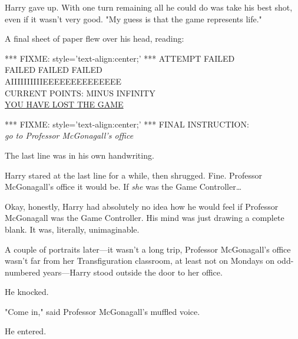 Harry gave up. With one turn remaining all he could do was take his best shot, 
even if it wasn't very good. "My guess is that the game represents life."

A final sheet of paper flew over his head, reading:

*** FIXME: style='text-align:center;' ***
ATTEMPT FAILED\\
FAILED FAILED FAILED\\
AIIIIIIIIIIEEEEEEEEEEEEEE\\
CURRENT POINTS: MINUS INFINITY\\
\underline{YOU HAVE LOST THE GAME}

*** FIXME: style='text-align:center;' ***
FINAL INSTRUCTION:\emph{\\
go to Professor McGonagall's office}

The last line was in his own handwriting.

Harry stared at the last line for a while, then shrugged. Fine. Professor 
McGonagall's office it would be. If \emph{she} was the Game Controller{\ldots}

Okay, honestly, Harry had absolutely no idea how he would feel if Professor 
McGonagall was the Game Controller. His mind was just drawing a complete blank. 
It was, literally, unimaginable.

A couple of portraits later---it wasn't a long trip, Professor McGonagall's 
office wasn't far from her Transfiguration classroom, at least not on Mondays 
on odd-numbered years---Harry stood outside the door to her office.

He knocked.

"Come in," said Professor McGonagall's muffled voice.

He entered.
